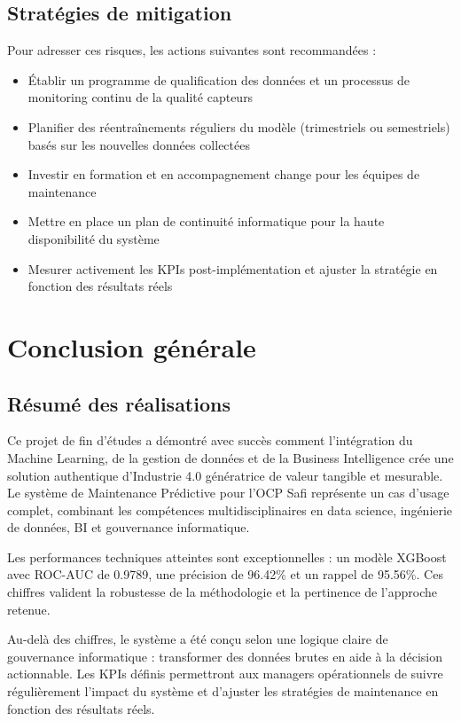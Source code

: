 \documentclass[a4paper,12pt,twoside]{report}
\begin{document}
\subsection{Stratégies de mitigation}

Pour adresser ces risques, les actions suivantes sont recommandées :

\begin{itemize}
    \item Établir un programme de qualification des données et un processus de monitoring continu de la qualité capteurs
    \item Planifier des réentraînements réguliers du modèle (trimestriels ou semestriels) basés sur les nouvelles données collectées
    \item Investir en formation et en accompagnement change pour les équipes de maintenance
    \item Mettre en place un plan de continuité informatique pour la haute disponibilité du système
    \item Mesurer activement les KPIs post-implémentation et ajuster la stratégie en fonction des résultats réels
\end{itemize}

\section{Conclusion générale}

\subsection{Résumé des réalisations}

Ce projet de fin d'études a démontré avec succès comment l'intégration du Machine Learning, de la gestion de données et de la Business Intelligence crée une solution authentique d'Industrie 4.0 génératrice de valeur tangible et mesurable. Le système de Maintenance Prédictive pour l'OCP Safi représente un cas d'usage complet, combinant les compétences multidisciplinaires en data science, ingénierie de données, BI et gouvernance informatique.

Les performances techniques atteintes sont exceptionnelles : un modèle XGBoost avec ROC-AUC de 0.9789, une précision de 96.42\% et un rappel de 95.56\%. Ces chiffres valident la robustesse de la méthodologie et la pertinence de l'approche retenue.

Au-delà des chiffres, le système a été conçu selon une logique claire de gouvernance informatique : transformer des données brutes en aide à la décision actionnable. Les KPIs définis permettront aux managers opérationnels de suivre régulièrement l'impact du système et d'ajuster les stratégies de maintenance en fonction des résultats réels.
\end{document}

